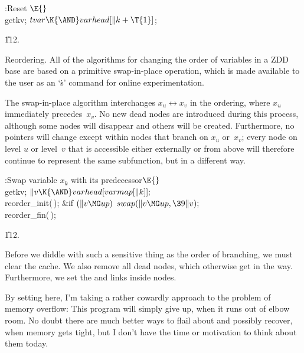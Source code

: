 \Y\B\4:Reset \X${}\E{}$\6
\\{getkv};\6
${}\\{tvar}\K{\AND}\\{varhead}[\|k+\T{1}]{}$;\par
\U112.\fi

Reordering. All of the algorithms for changing the
order of variables
in a ZDD base are
based on a primitive swap-in-place operation, which is made available
to the user as an `\.s' command for online experimentation.

The swap-in-place algorithm interchanges $x_u\leftrightarrow x_v$
in the ordering, where $x_u$ immediately precedes~$x_v$. No new dead nodes are
introduced during this process, although some nodes will disappear
and others will be created. Furthermore, no pointers will change
except within nodes that branch on $x_u$ or~$x_v$; every node on
level $u$ or level~$v$ that is accessible either externally or from above
will therefore continue to represent the same subfunction, but in a
different way.

\Y\B\4:Swap variable $x_k$ with its predecessor\X${}\E{}$\6
\\{getkv};\5
${}\|v\K{\AND}\\{varhead}[\\{varmap}[\|k]];{}$\6
\\{reorder\_init}(\,);\6
\&{if} ${}(\|v\MG\\{up}){}$\1\5
${}\\{swap}(\|v\MG\\{up},\39\|v);{}$\2\6
\\{reorder\_fin}(\,);\par
\U112.\fi

Before we diddle with such a sensitive thing as the order
of branching,
we must clear the cache. We also remove all dead nodes, which otherwise
get in the way. Furthermore, we set the  and  links
inside  nodes.

By setting  here, I'm taking a rather cowardly
approach
to the problem of memory overflow: This program will simply give up,
when it runs out of elbow room. No doubt there are much better ways
to flail about and possibly recover, when memory gets tight, but I
don't have the time or motivation to think about them today.

